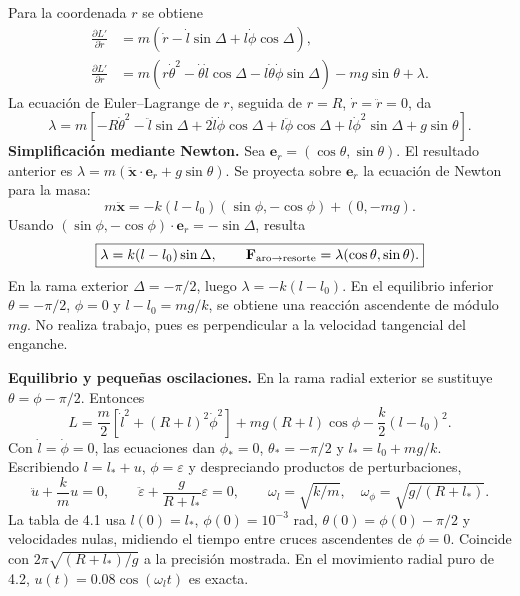 \documentclass[11pt,a4paper]{article}
\begin{document}
Para la coordenada $r$ se obtiene
\begin{align}
 \frac{\partial L'}{\partial\dot r}&=m(\dot r-\dot l\sin\Delta+l\dot\phi\cos\Delta),\\
 \frac{\partial L'}{\partial r}&=m(r\dot\theta^2-\dot\theta\dot l\cos\Delta-l\dot\theta\dot\phi\sin\Delta)
 -mg\sin\theta+\lambda.
\end{align}
La ecuación de Euler--Lagrange de $r$, seguida de $r=R$, $\dot r=\ddot r=0$, da
\begin{equation}
 \lambda=m[-R\dot\theta^2-\ddot l\sin\Delta+2\dot l\dot\phi\cos\Delta
 +l\ddot\phi\cos\Delta+l\dot\phi^2\sin\Delta+g\sin\theta].
\end{equation}
\textbf{Simplificación mediante Newton.} Sea $\mathbf e_r=(\cos\theta,\sin\theta)$. El resultado anterior es $\lambda=m(\ddot{\mathbf x}\cdot\mathbf e_r+g\sin\theta)$. Se proyecta sobre $\mathbf e_r$ la ecuación de Newton para la masa:
\begin{equation}
 m\ddot{\mathbf x}=-k(l-l_0)(\sin\phi,-\cos\phi)+(0,-mg).
\end{equation}
Usando $(\sin\phi,-\cos\phi)\cdot\mathbf e_r=-\sin\Delta$, resulta
\begin{equation}
 \boxed{\lambda=k(l-l_0)\sin\Delta,\qquad
 \mathbf F_{\rm aro\to resorte}=\lambda(\cos\theta,\sin\theta).}
\end{equation}
En la rama exterior $\Delta=-\pi/2$, luego $\lambda=-k(l-l_0)$. En el equilibrio inferior $\theta=-\pi/2$, $\phi=0$ y $l-l_0=mg/k$, se obtiene una reacción ascendente de módulo $mg$. No realiza trabajo, pues es perpendicular a la velocidad tangencial del enganche.

\newpage
{}
\textbf{Equilibrio y pequeñas oscilaciones.} En la rama radial exterior se sustituye $\theta=\phi-\pi/2$. Entonces
\begin{equation}
 L=\frac m2[\dot l^2+(R+l)^2\dot\phi^2]+mg(R+l)\cos\phi-\frac k2(l-l_0)^2.
\end{equation}
Con $\dot l=\dot\phi=0$, las ecuaciones dan $\phi_*=0$, $\theta_*=-\pi/2$ y $l_*=l_0+mg/k$. Escribiendo $l=l_*+u$, $\phi=\varepsilon$ y despreciando productos de perturbaciones,
\begin{equation}
 \ddot u+\frac kmu=0,\qquad \ddot\varepsilon+\frac g{R+l_*}\varepsilon=0,
 \qquad \omega_l=\sqrt{k/m},\quad\omega_\phi=\sqrt{g/(R+l_*)}.
\end{equation}
La tabla de 4.1 usa $l(0)=l_*$, $\phi(0)=10^{-3}$ rad, $\theta(0)=\phi(0)-\pi/2$ y velocidades nulas, midiendo el tiempo entre cruces ascendentes de $\phi=0$. Coincide con $2\pi\sqrt{(R+l_*)/g}$ a la precisión mostrada. En el movimiento radial puro de 4.2, $u(t)=0.08\cos(\omega_lt)$ es exacta.
\end{document}
